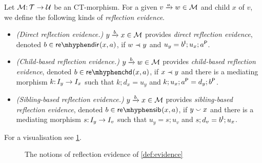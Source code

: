 \begin{definition}\label{def:evidence}
Let $\cM\of \cT\to\cU$ be an CT-morphism. For a given $\trip vaw\in\cM$ and child $x$ of $v$, we define the following kinds of \emph{reflection evidence}.
\begin{itemize}[topsep=\smallskipamount]
\item \emph{(Direct reflection evidence.)} $\trip ybx\in\cM$ provides \emph{direct reflection evidence}, denoted $\issdir b{x,a}$, if $w\parentof y$ and $u_y=b\I;u_x;a\P$.
\item \emph{(Child-based reflection evidence.)} $\trip ybw\in\cM$ provides \emph{child-based reflection evidence}, denoted $\isschd b{x,a}$, if $x\parentof y$ and there is a mediating morphism $k\of I_y\to I_x$ such that $k;d_x=u_y$ and $k;u_x;a\P=d_y;b\P$.
\item \emph{(Sibling-based reflection evidence.)} $\trip ybx\in\cM$ provides \emph{sibling-based reflection evidence}, denoted $\isssib b{x,a}$, if $y\sibling x$ and there is a mediating morphism $s\of I_y\to I_v$ such that $u_y=s;u_v$ and $s;d_v=b\I;u_x$.
\end{itemize}
\end{definition}
%
For a visualisation see \cref{fig:source-support}.
%
\begin{figure}
	
	\caption{The notions of reflection evidence of \cref{def:evidence}}
	\label{fig:source-support}
\end{figure}

